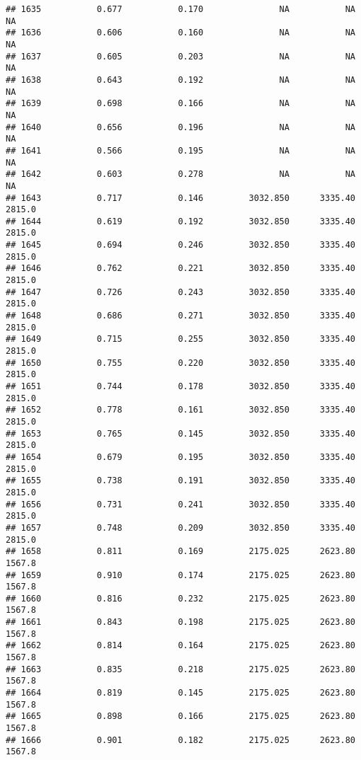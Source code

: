 \documentclass[
]{article}
\begin{document}
\begin{verbatim}
## 1635           0.677           0.170               NA           NA           NA
## 1636           0.606           0.160               NA           NA           NA
## 1637           0.605           0.203               NA           NA           NA
## 1638           0.643           0.192               NA           NA           NA
## 1639           0.698           0.166               NA           NA           NA
## 1640           0.656           0.196               NA           NA           NA
## 1641           0.566           0.195               NA           NA           NA
## 1642           0.603           0.278               NA           NA           NA
## 1643           0.717           0.146         3032.850      3335.40       2815.0
## 1644           0.619           0.192         3032.850      3335.40       2815.0
## 1645           0.694           0.246         3032.850      3335.40       2815.0
## 1646           0.762           0.221         3032.850      3335.40       2815.0
## 1647           0.726           0.243         3032.850      3335.40       2815.0
## 1648           0.686           0.271         3032.850      3335.40       2815.0
## 1649           0.715           0.255         3032.850      3335.40       2815.0
## 1650           0.755           0.220         3032.850      3335.40       2815.0
## 1651           0.744           0.178         3032.850      3335.40       2815.0
## 1652           0.778           0.161         3032.850      3335.40       2815.0
## 1653           0.765           0.145         3032.850      3335.40       2815.0
## 1654           0.679           0.195         3032.850      3335.40       2815.0
## 1655           0.738           0.191         3032.850      3335.40       2815.0
## 1656           0.731           0.241         3032.850      3335.40       2815.0
## 1657           0.748           0.209         3032.850      3335.40       2815.0
## 1658           0.811           0.169         2175.025      2623.80       1567.8
## 1659           0.910           0.174         2175.025      2623.80       1567.8
## 1660           0.816           0.232         2175.025      2623.80       1567.8
## 1661           0.843           0.198         2175.025      2623.80       1567.8
## 1662           0.814           0.164         2175.025      2623.80       1567.8
## 1663           0.835           0.218         2175.025      2623.80       1567.8
## 1664           0.819           0.145         2175.025      2623.80       1567.8
## 1665           0.898           0.166         2175.025      2623.80       1567.8
## 1666           0.901           0.182         2175.025      2623.80       1567.8

\end{verbatim}
\end{document}
